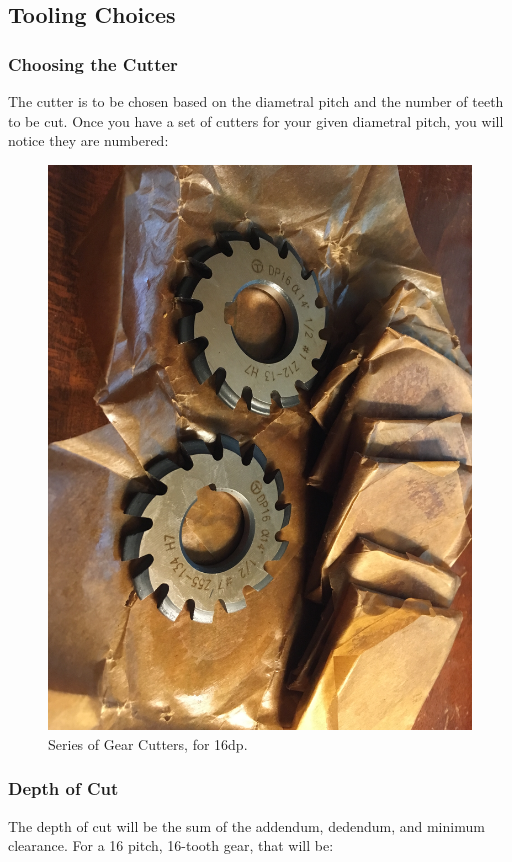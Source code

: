\documentclass[12pt,twoside,letterpaper]{article}
\begin{document}
\subsection{Tooling Choices}
\subsubsection{Choosing the Cutter}
The cutter is to be chosen based on the diametral pitch and the number of teeth to be cut. Once you have a set of cutters for your given diametral pitch, you will notice they are numbered:

\begin{figure}[H]
\centering
\includegraphics[width=5in]{cutter2}
	\caption{Series of Gear Cutters, for 16dp.}
\end{figure}

\subsubsection{Depth of Cut}
The depth of cut will be the sum of the addendum, dedendum, and minimum clearance. For a 16 pitch, 16-tooth gear, that will be:
\end{document}
